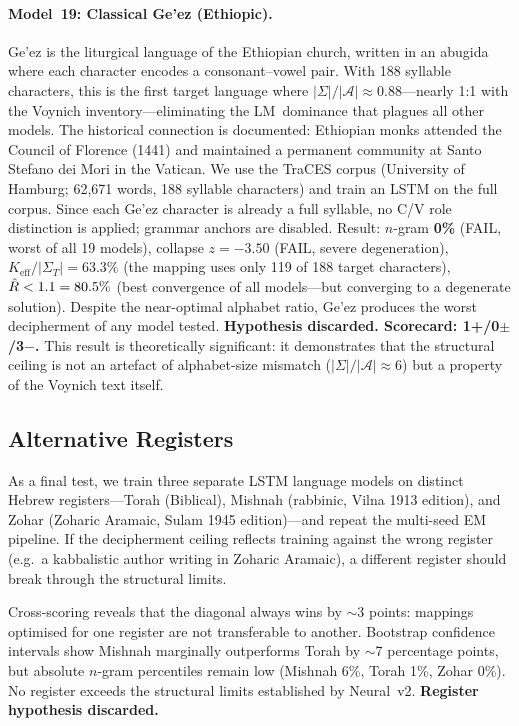 \paragraph{Model~19: Classical Ge'ez (Ethiopic).}
Ge'ez is the liturgical language of the Ethiopian church, written in an abugida where each character encodes a consonant--vowel pair.  With 188 syllable characters, this is the first target language where $|\Sigma|/|\mathcal{A}| \approx 0.88$---nearly 1:1 with the Voynich inventory---eliminating the LM~dominance that plagues all other models.  The historical connection is documented: Ethiopian monks attended the Council of Florence (1441) and maintained a permanent community at Santo Stefano dei Mori in the Vatican.  We use the TraCES corpus (University of Hamburg; 62,671 words, 188 syllable characters) and train an LSTM on the full corpus.  Since each Ge'ez character is already a full syllable, no C/V role distinction is applied; grammar anchors are disabled.  Result: $n$-gram \textbf{0\%} (FAIL, worst of all 19 models), collapse $z = -3.50$ (FAIL, severe degeneration), $K_{\text{eff}}/|\Sigma_T| = 63.3\%$ (the mapping uses only 119 of 188 target characters), $\hat{R} < 1.1 = 80.5\%$ (best convergence of all models---but converging to a degenerate solution).  Despite the near-optimal alphabet ratio, Ge'ez produces the worst decipherment of any model tested.  \textbf{Hypothesis discarded.  Scorecard: 1+/0$\pm$/3$-$.}  This result is theoretically significant: it demonstrates that the structural ceiling is not an artefact of alphabet-size mismatch ($|\Sigma|/|\mathcal{A}| \approx 6$) but a property of the Voynich text itself.

\subsection{Alternative Registers}

As a final test, we train three separate LSTM language models on distinct Hebrew registers---Torah (Biblical), Mishnah (rabbinic, Vilna 1913 edition), and Zohar (Zoharic Aramaic, Sulam 1945 edition)---and repeat the multi-seed EM pipeline.  If the decipherment ceiling reflects training against the wrong register (e.g.\ a kabbalistic author writing in Zoharic Aramaic), a different register should break through the structural limits.

Cross-scoring reveals that the diagonal always wins by $\sim$3 points: mappings optimised for one register are not transferable to another.  Bootstrap confidence intervals show Mishnah marginally outperforms Torah by $\sim$7 percentage points, but absolute $n$-gram percentiles remain low (Mishnah 6\%, Torah 1\%, Zohar 0\%).  No register exceeds the structural limits established by Neural~v2.  \textbf{Register hypothesis discarded.}

